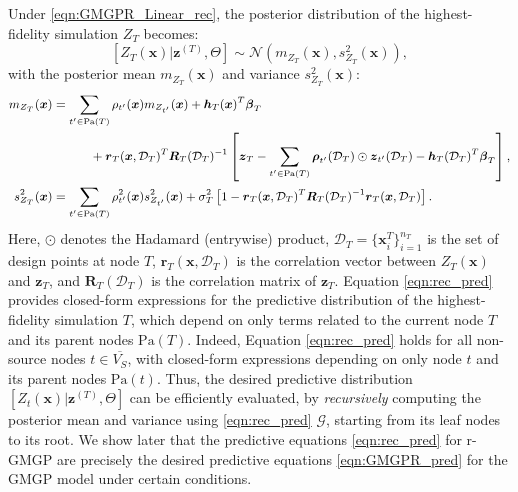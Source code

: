 \documentclass[12pt]{article}
\newcommand{\bs}[1]{\boldsymbol{#1}}
\newcommand{\cbl}[1]{{\color{black}{#1}}}
\begin{document}
Under \eqref{eqn:GMGPR_Linear_rec}, the posterior distribution of the highest-fidelity simulation $Z_T$ becomes:
\[ [Z_T(\bs{x})|\bs{z}^{(T)},\Theta] \sim \mathcal{N}(m_{Z_T}(\bs{x}),s^2_{Z_T}(\bs{x})),\]
with the posterior mean $m_{Z_T}(\bs{x})$ and variance $s^2_{Z_T}(\bs{x})$:
\small
\begin{align}\label{eqn:rec_pred}
\small
\begin{split}
    m_{Z_T}(\bs{x}) &= \sum_{t'\in \text{Pa}(T)}\rho_{t'}(\bs{x}) m_{Z_{t'}}(\bs{x})+\bs{h}_{T}(\bs{x})^T\bs{\beta}_T
    \\
    & \quad \quad \quad  + \bs{r}_{T}(\bs{x},\mathcal{D}_T)^T\bs{R}_{T}(\mathcal{D}_T)^{-1}\left[\bs{z}_T -\sum_{t'\in\text{Pa}(T)}\bs{\rho}_{t'}(\mathcal{D}_{T})\odot \bs{z}_{t'}(\mathcal{D}_{T}) - \bs{h}_{T}(\mathcal{D}_{T})^T\bs{\beta}_{T}\right], \\
    s^2_{Z_T}(\bs{x}) &= \sum_{t'\in \text{Pa}(T)}\rho^2_{t'}(\bs{x})s^2_{Z_{t'}}(\bs{x}) + \sigma^2_{T}\left[1-\bs{r}_{T}(\bs{x},\mathcal{D}_T)^T\bs{R}_{T}(\mathcal{D}_T)^{-1}\bs{r}_{T}(\bs{x},\mathcal{D}_T)\right].
\end{split}
\end{align}
\normalsize
Here, $\odot$ denotes the Hadamard (entrywise) product, $\mathcal{D}_T = \{\bs{x}_i^T\}_{i=1}^{n_T}$ is the set of design points at node $T$, $\bs{r}_T(\bs{x},\mathcal{D}_T)$ is the correlation vector between $Z_T(\bs{x})$ and $\bs{z}_T$, and $\bs{R}_T(\mathcal{D}_T)$ is the correlation matrix of $\bs{z}_T$. 
Equation \eqref{eqn:rec_pred} provides closed-form expressions for the predictive distribution of the highest-fidelity simulation $T$, which depend on only terms related to the current node $T$ and its parent nodes $\text{Pa}(T)$. Indeed, Equation \eqref{eqn:rec_pred} holds for all non-source nodes $t \in \overline{V_S}$, with closed-form expressions depending on only node $t$ and its parent nodes $\text{Pa}(t)$. Thus, the desired predictive distribution $[Z_t(\bs{x})|\bs{z}^{(T)},\Theta]$ can be efficiently evaluated, by \textit{recursively} computing the posterior mean and variance using \eqref{eqn:rec_pred} \cbl{at each depth level of} $\mathcal{G}$, starting from its leaf nodes to its root. We show later that the predictive equations \eqref{eqn:rec_pred} for r-GMGP are precisely the desired predictive equations \eqref{eqn:GMGPR_pred} for the GMGP model under certain conditions.
\end{document}
